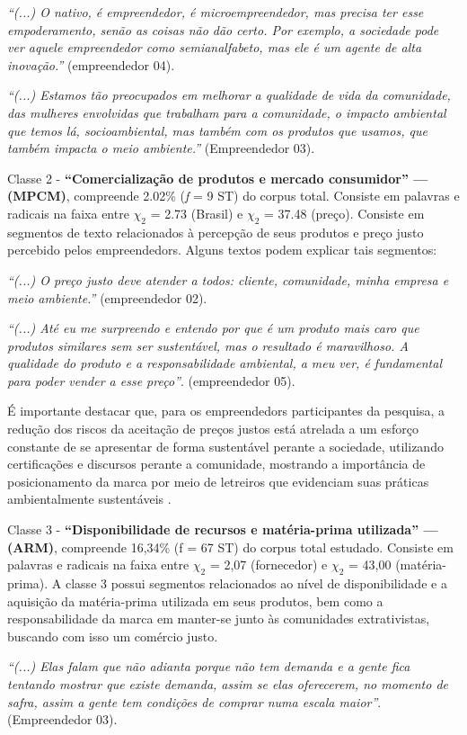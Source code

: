 \textit{“(...) O nativo, é empreendedor, é microempreendedor, mas precisa ter esse empoderamento, senão as coisas não dão certo. Por exemplo, a sociedade pode ver aquele empreendedor como semianalfabeto, mas ele é um agente de alta inovação.”} (empreendedor 04).

\textit{“(...) Estamos tão preocupados em melhorar a qualidade de vida da comunidade, das mulheres envolvidas que trabalham para a comunidade, o impacto ambiental que temos lá, socioambiental, mas também com os produtos que usamos, que também impacta o meio ambiente.”} (Empreendedor 03).

Classe 2 - \textbf{“Comercialização de produtos e mercado consumidor” — (MPCM)}, compreende 2.02\% (\textit{f} = 9 ST) do corpus total. Consiste em palavras e radicais na faixa entre $\chi_2$ = 2.73 (Brasil) e $\chi_2$ = 37.48 (preço). Consiste em segmentos de texto relacionados à percepção de seus produtos e preço justo percebido pelos empreendedors. Alguns textos podem explicar tais segmentos:

\textit{“(...) O preço justo deve atender a todos: cliente, comunidade, minha empresa e meio ambiente.”} (empreendedor 02).

\textit{“(...) Até eu me surpreendo e entendo por que é um produto mais caro que produtos similares sem ser sustentável, mas o resultado é maravilhoso. A qualidade do produto e a responsabilidade ambiental, a meu ver, é fundamental para poder vender a esse preço”}. (empreendedor 05).

É importante destacar que, para os empreendedors participantes da pesquisa, a redução dos riscos da aceitação de preços justos está atrelada a um esforço constante de se apresentar de forma sustentável perante a sociedade, utilizando certificações e discursos perante a comunidade, mostrando a importância de posicionamento da marca por meio de letreiros que evidenciam suas práticas ambientalmente sustentáveis \cite{Dwivedi2018BrandUniqueness}.

Classe 3 - \textbf{“Disponibilidade de recursos e matéria-prima utilizada” — (ARM)}, compreende 16,34\% (f = 67 ST) do corpus total estudado. Consiste em palavras e radicais na faixa entre $\chi_2$ = 2,07 (fornecedor) e $\chi_2$ = 43,00 (matéria-prima). A classe 3 possui segmentos relacionados ao nível de disponibilidade e a aquisição da matéria-prima utilizada em seus produtos, bem como a responsabilidade da marca em manter-se junto às comunidades extrativistas, buscando com isso um comércio justo.

\textit{“(...) Elas falam que não adianta porque não tem demanda e a gente fica tentando mostrar que existe demanda, assim se elas oferecerem, no momento de safra, assim a gente tem condições de comprar numa escala maior”}. (Empreendedor 03).

